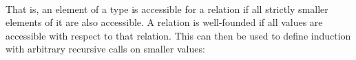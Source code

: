 \begin{code}[hide]
\AgdaSpace{}%
\AgdaSpace{}%
\AgdaSpace{}%
\AgdaSpace{}%
\AgdaSpace{}%
\AgdaSpace{}%
\AgdaSpace{}%
\AgdaSpace{}%
\AgdaSymbol{(}\AgdaSpace{}%
\AgdaSpace{}%
\AgdaSpace{}%
\AgdaSymbol{))}\<%
\\
%
\>[2]\AgdaSpace{}%
\AgdaSpace{}%
\AgdaSpace{}%
\AgdaSymbol{(}\AgdaSpace{}%
\AgdaSymbol{)}\AgdaSpace{}%
\AgdaSymbol{=}\AgdaSpace{}%
\<%
\\
%
\\[\AgdaEmptyExtraSkip]%
\>[0]\AgdaSpace{}%
\AgdaSpace{}%
\AgdaSymbol{\{}\AgdaOperator{\AgdaBound{\AgdaUnderscore{}<\AgdaUnderscore{}}}\AgdaSpace{}%
\AgdaSymbol{:}\AgdaSpace{}%
\AgdaSpace{}%
\AgdaSpace{}%
\AgdaSymbol{\}}\AgdaSpace{}%
\AgdaSymbol{(}\AgdaSpace{}%
\AgdaSymbol{:}\AgdaSpace{}%
\AgdaSpace{}%
\AgdaOperator{\AgdaBound{\AgdaUnderscore{}<\AgdaUnderscore{}}}\AgdaSymbol{)}\AgdaSpace{}%
\AgdaSpace{}%
\<%
\\
%
\\[\AgdaEmptyExtraSkip]%
\>[0][@{}l@{\AgdaIndent{0}}]%
\>[2]\AgdaSpace{}%
\AgdaSymbol{:}\AgdaSpace{}%
\AgdaSpace{}%
\AgdaSymbol{(}\AgdaSpace{}%
\AgdaOperator{\AgdaBound{\AgdaUnderscore{}<\AgdaUnderscore{}}}\AgdaSpace{}%
\AgdaSymbol{\{}\AgdaSpace{}%
\AgdaSymbol{=}\AgdaSpace{}%
\AgdaSymbol{\})}\<%
\\
%
\>[2]\AgdaSpace{}%
\AgdaSpace{}%
\AgdaSpace{}%
\AgdaSpace{}%
\AgdaSymbol{=}\AgdaSpace{}%
\AgdaSpace{}%
\AgdaSpace{}%
\AgdaSpace{}%
\AgdaSpace{}%
\AgdaSymbol{(}\AgdaSpace{}%
\AgdaSymbol{)}\<%
\end{code}


That is, an element of a type is accessible for a relation if all strictly
smaller elements of it are also accessible. A relation is well-founded
if all values are accessible with respect to that relation.
This can then be used to define induction with arbitrary recursive
calls on smaller values:

